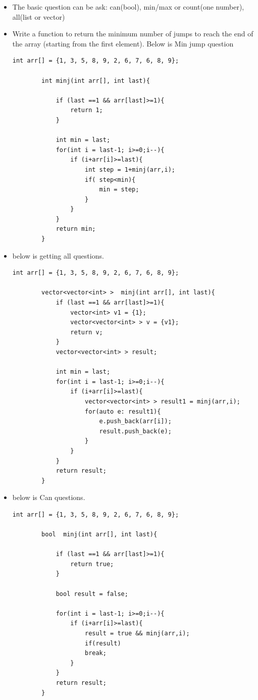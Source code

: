 \documentclass[a4paper,11pt,twoside]{book}
\begin{document}
\begin{itemize}
	
	\item The basic question can be ask: can(bool), min/max or count(one number), all(list or vector)
	
	
	\item  Write a function to return the minimum number of jumps to reach the end of the array (starting from the first element). Below is Min jump question
	
	\begin{lstlisting}[numbers=none]
		int arr[] = {1, 3, 5, 8, 9, 2, 6, 7, 6, 8, 9};
		
		int minj(int arr[], int last){
			
			if (last ==1 && arr[last]>=1){
				return 1;
			}
			
			int min = last;
			for(int i = last-1; i>=0;i--){
				if (i+arr[i]>=last){
					int step = 1+minj(arr,i);
					if( step<min){
						min = step;
					}
				}    
			}
			return min;
		}	
	\end{lstlisting} 	
	
	
	\item below is getting all questions.  
	\begin{lstlisting}[numbers=none]
		int arr[] = {1, 3, 5, 8, 9, 2, 6, 7, 6, 8, 9};
		
		vector<vector<int> >  minj(int arr[], int last){	
			if (last ==1 && arr[last]>=1){
				vector<int> v1 = {1};
				vector<vector<int> > v = {v1};
				return v;
			}	
			vector<vector<int> > result;
			
			int min = last;
			for(int i = last-1; i>=0;i--){
				if (i+arr[i]>=last){
					vector<vector<int> > result1 = minj(arr,i);
					for(auto e: result1){
						e.push_back(arr[i]);
						result.push_back(e);
					}
				}
			}
			return result;
		}				
	\end{lstlisting} 
	
	\item below is Can questions.  
	\begin{lstlisting}[numbers=none]
		int arr[] = {1, 3, 5, 8, 9, 2, 6, 7, 6, 8, 9};
		
		bool  minj(int arr[], int last){
			
			if (last ==1 && arr[last]>=1){
				return true;
			}
			
			bool result = false;
			
			for(int i = last-1; i>=0;i--){
				if (i+arr[i]>=last){
					result = true && minj(arr,i);
					if(result)
					break;
				}
			}
			return result;
		}	
	\end{lstlisting} 
	

\end{itemize}
\end{document}

